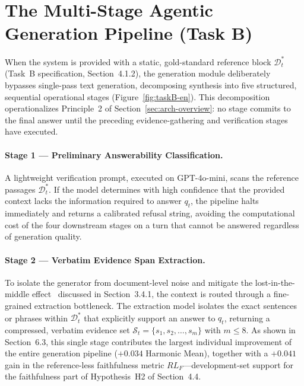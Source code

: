 \section{The Multi-Stage Agentic Generation Pipeline (Task B)}
\label{sec:generation-pipeline}

When the system is provided with a static, gold-standard reference block $\mathcal{D}_t^*$ (Task~B specification, Section~4.1.2), the generation module deliberately bypasses single-pass text generation, decomposing synthesis into five structured, sequential operational stages (Figure~\ref{fig:taskB-en}). This decomposition operationalizes Principle~2 of Section~\ref{sec:arch-overview}: no stage commits to the final answer until the preceding evidence-gathering and verification stages have executed.

\paragraph{Stage 1 --- Preliminary Answerability Classification.}
A lightweight verification prompt, executed on GPT-4o-mini, scans the reference passages $\mathcal{D}_t^*$. If the model determines with high confidence that the provided context lacks the information required to answer $q_t$, the pipeline halts immediately and returns a calibrated refusal string, avoiding the computational cost of the four downstream stages on a turn that cannot be answered regardless of generation quality.

\paragraph{Stage 2 --- Verbatim Evidence Span Extraction.}
To isolate the generator from document-level noise and mitigate the lost-in-the-middle effect~\citep{liu2024lost} discussed in Section~3.4.1, the context is routed through a fine-grained extraction bottleneck. The extraction model isolates the exact sentences or phrases within $\mathcal{D}_t^*$ that explicitly support an answer to $q_t$, returning a compressed, verbatim evidence set $\mathcal{S}_t = \{s_1, s_2, \dots, s_m\}$ with $m \leq 8$. As shown in Section~6.3, this single stage contributes the largest individual improvement of the entire generation pipeline ($+0.034$ Harmonic Mean), together with a $+0.041$ gain in the reference-less faithfulness metric $RL_F$---development-set support for the faithfulness part of Hypothesis~H2 of Section~4.4.

